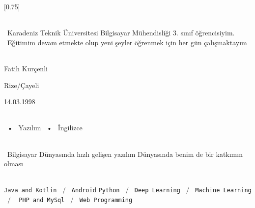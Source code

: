 \documentclass[lighthipster]{simplehipstercv}
\begin{document}
\setlength{\columnsep}{1.5cm}
[0.75]
\begin{paracol}{2}


\paracolbackgroundoptions



\footnotesize
{\setasidefontcolour
\flushright
\begin{center}
\end{center}

\\[0.5em]

{\footnotesize
\ Karadeniz Teknik Üniversitesi Bilgisayar Mühendisliği 3. sınıf öğrencisiyim. \ Eğitimim devam etmekte olup yeni şeyler öğrenmek için her gün çalışmaktayım}
\bigskip

 \\[0.5em]
Fatih Kurçenli

Rize/Çayeli

14.03.1998

\bigskip

 \\[0.5em]

 ~•~ Yazılım ~•~ İngilizce

\bigskip



\bigskip

\\[0.5em]

\ Bilgisayar Dünyasında hızlı gelişen yazılım Dünyasında benim de bir katkımın olması
\bigskip
\vspace{4em}

\\[0.5em]

\texttt{Java and Kotlin} ~/~ \texttt{Android}
\texttt{Python} ~/~ \texttt{Deep Learning} ~/~ \texttt{Machine Learning} ~/    ~      
\texttt{PHP and MySql} ~/~ \texttt{Web Programming}

\vspace{7em}

\phantom{turn the page}

\phantom{turn the page}
}
\switchcolumn


\end{paracol}
\end{document}
